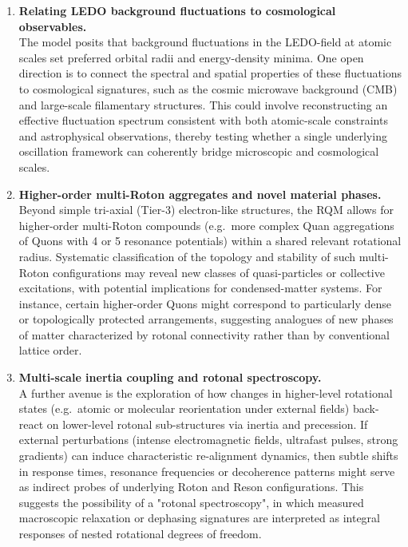 \documentclass[11pt,a4paper]{article}
\begin{document}
\begin{enumerate}
    \item \textbf{Relating LEDO background fluctuations to cosmological observables.}\\
    The model posits that background fluctuations in the LEDO-field at atomic scales set preferred orbital radii and energy-density minima.
    One open direction is to connect the spectral and spatial properties of these fluctuations to cosmological signatures, such as the cosmic microwave background (CMB) and large-scale filamentary structures.
    This could involve reconstructing an effective fluctuation spectrum consistent with both atomic-scale constraints and astrophysical observations, thereby testing whether a single underlying oscillation framework can coherently bridge microscopic and cosmological scales.

    \item \textbf{Higher-order multi-Roton aggregates and novel material phases.}\\
    Beyond simple tri-axial (Tier-3) electron-like structures, the RQM allows for higher-order multi-Roton compounds (e.g.\ more complex Quan aggregations of Quons with 4 or 5 resonance potentials) within a shared relevant rotational radius.
    Systematic classification of the topology and stability of such multi-Roton configurations may reveal new classes of quasi-particles or collective excitations, with potential implications for condensed-matter systems.
    For instance, certain higher-order Quons might correspond to particularly dense or topologically protected arrangements, suggesting analogues of new phases of matter characterized by rotonal connectivity rather than by conventional lattice order.

    \item \textbf{Multi-scale inertia coupling and rotonal spectroscopy.}\\
    A further avenue is the exploration of how changes in higher-level rotational states (e.g.\ atomic or molecular reorientation under external fields) back-react on lower-level rotonal sub-structures via inertia and precession.
    If external perturbations (intense electromagnetic fields, ultrafast pulses, strong gradients) can induce characteristic re-alignment dynamics, then subtle shifts in response times, resonance frequencies or decoherence patterns might serve as indirect probes of underlying Roton and Reson configurations.
    This suggests the possibility of a "rotonal spectroscopy", in which measured macroscopic relaxation or dephasing signatures are interpreted as integral responses of nested rotational degrees of freedom.


\end{enumerate}
\end{document}

